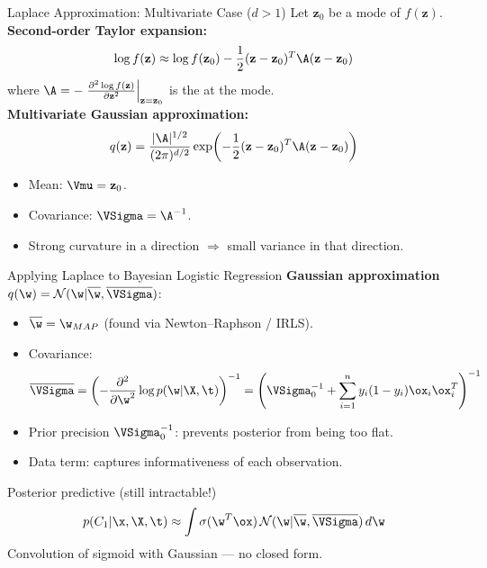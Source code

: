 \begin{frame}{Laplace Approximation: Multivariate Case ($d>1$)}
  Let $\mathbf{z}_0$ be a mode of $f(\mathbf{z})$.\\[0.3em]
  \textbf{Second-order Taylor expansion:}
  \[
    \log f(\mathbf{z}) \approx \log f(\mathbf{z}_0) - \frac{1}{2}(\mathbf{z}-\mathbf{z}_0)^T\A(\mathbf{z}-\mathbf{z}_0)
  \]
  where $\A = -\left.\frac{\partial^2\log f(\mathbf{z})}{\partial\mathbf{z}^2}\right|_{\mathbf{z}=\mathbf{z}_0}$ is the  at the mode.\\[0.4em]
  \textbf{Multivariate Gaussian approximation:}
  \[
    q(\mathbf{z}) = \frac{|\A|^{1/2}}{(2\pi)^{d/2}}\exp\!\left(-\frac{1}{2}(\mathbf{z}-\mathbf{z}_0)^T\A(\mathbf{z}-\mathbf{z}_0)\right)
  \]
  \begin{itemize}
    \item Mean: $\Vmu = \mathbf{z}_0$.
    \item Covariance: $\VSigma = \A^{-1}$.
    \item Strong curvature in a direction $\Rightarrow$ small variance in that direction.
  \end{itemize}
\end{frame}

\begin{frame}{Applying Laplace to Bayesian Logistic Regression}
  \textbf{Gaussian approximation} $q(\w) = \mathcal{N}(\w|\overline{\w},\overline{\VSigma})$:
  \begin{itemize}
    \item $\overline{\w} = \w_{MAP}$ (found via Newton--Raphson / IRLS).
    \item Covariance:
      \[
        \overline{\VSigma} = \left(-\frac{\partial^2}{\partial\w^2}\log p(\w|\X,\t)\right)^{-1}
        = \left(\VSigma_0^{-1} + \sum_{i=1}^n y_i(1-y_i)\ox_i\ox_i^T\right)^{-1}
      \]
    \item Prior precision $\VSigma_0^{-1}$: prevents posterior from being too flat.
    \item Data term: captures informativeness of each observation.
  \end{itemize}
  \vspace{0.2cm}
  \begin{block}{Posterior predictive (still intractable!)}
    \[
      p(C_1|\x,\X,\t) \approx \int \sigma(\w^T\ox)\,\mathcal{N}(\w|\overline{\w},\overline{\VSigma})\,d\w
    \]
    Convolution of sigmoid with Gaussian — no closed form.
  \end{block}
\end{frame}

